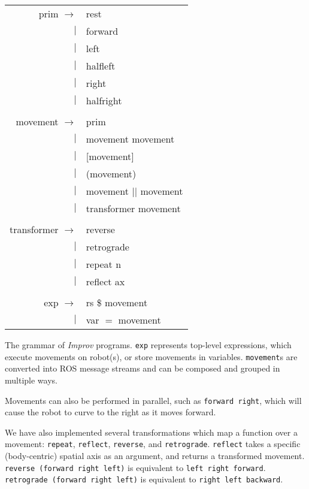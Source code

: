 \documentclass[sigchi-a]{acmart}
\begin{document}
\begin{margintable}
\begin{tabular}{rl}
prim $\rightarrow$ & rest  \\
     $|$ & forward \\
     $|$ & left  \\
     $|$ & halfleft\\
     $|$ & right \\
     $|$ & halfright \\
\\
movement $\rightarrow$ & prim \\
         $|$ & movement movement \\
         $|$ & [movement] \\
         $|$ & (movement) \\
         $|$ & movement $||$ movement  \\
         $|$ & transformer movement \\
\\
transformer $\rightarrow$ & reverse \\
  $|$ & retrograde \\
  $|$ & repeat n \\
  $|$ & reflect ax \\
\\
exp $\rightarrow$ & rs \$ movement \\
    $|$ & var $=$ movement
\end{tabular}

\caption{The grammar of \emph{Improv} programs. \texttt{exp} represents top-level
expressions, which execute movements on robot(s), or store movements in
variables. \texttt{movement}s are converted into ROS message streams and can be
composed and grouped in multiple ways. \label{grammar}}
\end{margintable}


Movements can also be performed in parallel, such as
\texttt{forward \textbar{}\textbar{} right}, which will cause the
robot to curve to the right as it moves forward.


We have also implemented several transformations which map a function
over a movement: \texttt{repeat}, \texttt{reflect},
\texttt{reverse}, and \texttt{retrograde}. \texttt{reflect} takes a specific
(body-centric) spatial axis as an argument, and returns a transformed movement.
\texttt{reverse\ (forward\ right\ left)} is equivalent to
\texttt{left\ right\ forward}. \texttt{retrograde\ (forward\ right\ left)} is equivalent
to \texttt{right\ left\ backward}.
\end{document}
